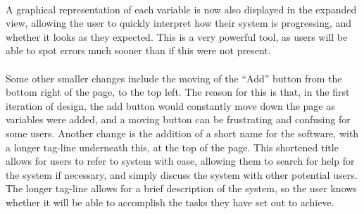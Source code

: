\ \\
A graphical representation of each variable is now also displayed in the expanded view, allowing the user to quickly interpret how their system is progressing, and whether it looks as they expected. This is a very powerful tool, as users will be able to spot errors much sooner than if this were not present.\ \\
\ \\
Some other smaller changes include the moving of the ``Add'' button from the bottom right of the page, to the top left. The reason for this is that, in the first iteration of design, the add button would constantly move down the page as variables were added, and a moving button can be frustrating and confusing for some users. Another change is the addition of a short name for the software, with a longer tag-line underneath this, at the top of the page. This shortened title allows for users to refer to system with ease, allowing them to search for help for the system if necessary, and simply discuss the system with other potential users. The longer tag-line allows for a brief description of the system, so the user knows whether it will be able to accomplish the tasks they have set out to achieve.



